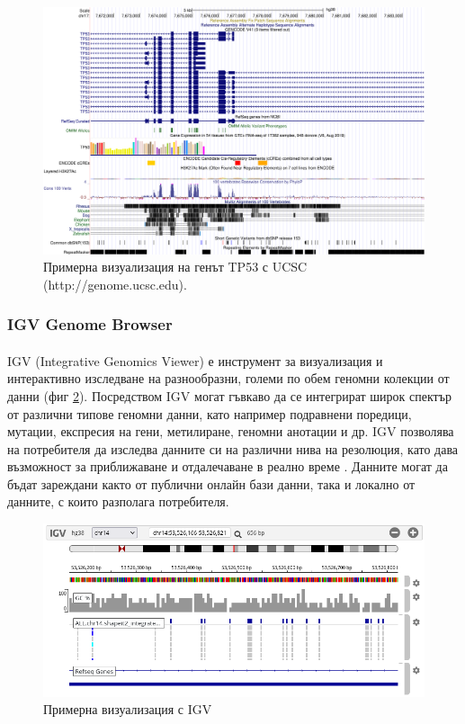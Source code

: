 \documentclass[pdftex,cyrillic,14pt,a4page,twoside,openright]{extreport}
\begin{document}
\begin{figure}[h]
  \centering
  \includegraphics[width=16cm]{figures/UCSC}
  \caption {Примерна визуализация на генът TP53 с UCSC (http://genome.ucsc.edu).}
  \label{fig:ucsc}
\end{figure}

\subsubsection{IGV Genome Browser}\label{sec:igv}
\paragraph{}
IGV (Integrative Genomics Viewer) е инструмент за визуализация и интерактивно изследване на разнообразни, големи по обем геномни колекции от данни (фиг \ref{fig:igv_example}). Посредством IGV могат гъвкаво да се интегрират широк спектър от различни типове геномни данни, като например подравнени поредици, мутации, експресия на гени, метилиране, геномни анотации и др. IGV позволява на потребителя да изследва данните си на различни нива на резолюция, като дава възможност за приближаване и отдалечаване в реално време \cite{robinson2011, robinson2017}. Данните могат да бъдат зареждани както от публични онлайн бази данни, така и локално от данните, с които разполага потребителя.

\begin{figure}[h]
  \centering
  \includegraphics[width=17cm]{figures/igv_example}
  \caption {Примерна визуализация с IGV}
  \label{fig:igv_example}
\end{figure}
\end{document}
